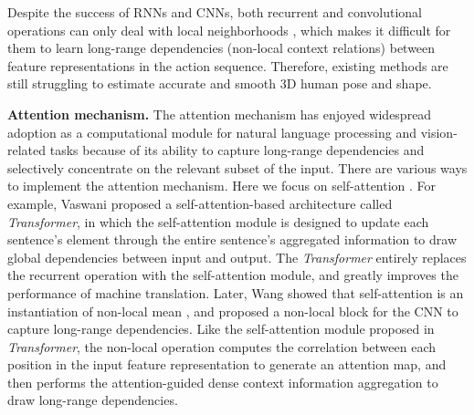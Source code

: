 \documentclass[10pt,twocolumn,letterpaper]{article}
\begin{document}
Despite the success of RNNs and CNNs, both recurrent and convolutional operations can only deal with local neighborhoods \cite{Vaswani2017AttentionIA ,Wang2018NonlocalNN}, which makes it difficult for them to learn long-range dependencies (\ie non-local context relations) between feature representations in the action sequence. Therefore, existing methods are still struggling to estimate accurate and smooth 3D human pose and shape.\vspace{5pt}

{\bf Attention mechanism.} The attention mechanism has enjoyed widespread adoption as a computational module for natural language processing \cite{Vaswani2017AttentionIA,Devlin2019BERTPO,Radford2018ImprovingLU,Bahdanau2015NeuralMT,Yu2018QANetCL} and vision-related tasks \cite{Wang2018NonlocalNN,Hsieh2019OneShotOD,Dosovitskiy2020AnII,Hu2020SqueezeandExcitationN,Woo2018CBAMCB,Roy2019RecalibratingFC,Chen_2021_CVPR} because of its ability to capture long-range dependencies and selectively concentrate on the relevant subset of the input. There are various ways to implement the attention mechanism. Here we focus on self-attention \cite{Vaswani2017AttentionIA,Wang2018NonlocalNN}. For example, Vaswani \etal \cite{Vaswani2017AttentionIA} proposed a self-attention-based architecture called \emph{Transformer}, in which the self-attention module is designed to update each sentence’s element through the entire sentence’s aggregated information to draw global dependencies between input and output. The \emph{Transformer} entirely replaces the recurrent operation with the self-attention module, and greatly improves the performance of machine translation. Later, Wang \etal \cite{Wang2018NonlocalNN} showed that self-attention is an instantiation of non-local mean \cite{Buades2005ANA}, and proposed a non-local block for the CNN to capture long-range dependencies. Like the self-attention module proposed in \emph{Transformer}, the non-local operation computes the correlation between each position in the input feature representation to generate an attention map, and then performs the attention-guided dense context information aggregation to draw long-range dependencies.
\end{document}
